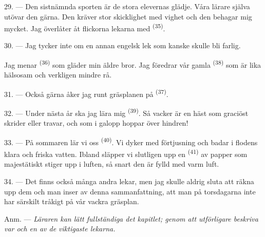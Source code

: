 29. --- Den sistnämnda sporten är de stora elevernas glädje. Våra lärare själva utövar den
gärna. Den kräver stor skicklighet med vighet och den behagar mig mycket. Jag överlåter åt
flickorna lekarna med  \textsuperscript{(35)}.

30. --- Jag tycker inte om en annan engelsk lek som kanske skulle bli farlig.

Jag menar  \textsuperscript{(36)} som gläder min äldre bror. Jag föredrar
vår gamla  \textsuperscript{(38)} som är lika hälsosam och verkligen mindre rå.

\VUsaut{4.6mm}
\VUsaut{3.0mm}

31. --- Också gärna åker jag runt gräsplanen på  \textsuperscript{(37)}.

32. --- Under nästa år ska jag lära mig  \textsuperscript{(39)}. Så vacker
är en häst som graciöst skrider eller travar, och som i galopp hoppar över hindren!

33. --- På sommaren lär vi oss  \textsuperscript{(40)}. Vi dyker med
förtjusning och badar i flodens klara och friska vatten. Ibland släpper vi slutligen upp en
 \textsuperscript{(41)} av papper som majestätiskt stiger upp i luften, så
snart den är fylld med varm luft.

34. --- Det finns också många andra lekar, men jag skulle aldrig sluta att räkna upp dem och
man inser av denna sammanfattning, att man på torsdagarna inte har särskilt tråkigt på vår
vackra gräsplan.

Anm. --- \textit{Läraren kan lätt fullständiga det kapitlet; genom att utförligare beskriva
var och en av de viktigaste lekarna.}
\VUsaut{6.0mm}
\VUfilet{22mm}
